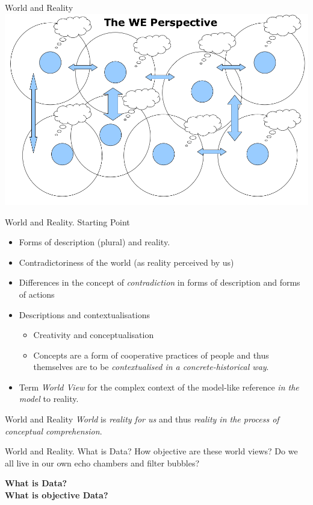 \documentclass{beamer}
\begin{document}
\begin{frame}{World and Reality}\centering
    \includegraphics[width=.9\textwidth]{Bilder/DI-3.png}
\end{frame}
\begin{frame}{World and Reality. Starting Point}
  \begin{itemize}
  \item Forms of description (plural) and reality.
  \item Contradictoriness of the world (as reality perceived by us)
  \item Differences in the concept of \emph{contradiction} in forms of
    description and forms of actions
  \item Descriptions and contextualisations
    \begin{itemize}
    \item Creativity and conceptualisation
    \item Concepts are a form of cooperative practices of people and thus
      themselves are to be \emph{contextualised in a concrete-historical way}.
    \end{itemize}
  \item Term \emph{World View} for the complex context of the model-like
    reference \emph{in the model} to reality.
  \end{itemize}
  \begin{block}{World and Reality}
    \emph{World} is \emph{reality for us} and thus \emph{reality in the
      process of conceptual comprehension}.
  \end{block}
\end{frame}
\begin{frame}{World and Reality. What is Data?}
How objective are these world views? Do we all live in our own echo chambers
and filter bubbles?

\begin{center}  \LARGE\bf
  \vfill What is Data?\\[1em] What is objective Data? \vfill  
\end{center}

\end{frame}
\end{document}
